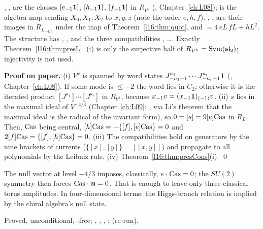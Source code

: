 \begin{dictionary}
, ,  are the classes $[e_{-1}\mathbf{1}]$, $[h_{-1}\mathbf{1}]$, $[f_{-1}\mathbf{1}]$ in
$R_{V^k}$ (, Chapter~\ref{ch:L08}); \allowbreak{} is the algebra map
sending $X_0,X_1,X_2$ to $x,y,z$ (note the order $e,h,f$). , ,  are their images in
$R_{L_{-4/3}}$ under the map of Theorem~\ref{l16:thm:quot}, and  $=4\,eL\,fL + hL^2$. The structure
 has \allowbreak{}, \allowbreak{},
\allowbreak{}\allowbreak{} and the three compatibilities , \ldots. Exactly
Theorem~\ref{l16:thm:presL}. (i) is only the surjective half of $R_{V^k} = \operatorname{Sym}(\mathfrak{sl}_2)$; injectivity is not
used.
\end{dictionary}

\textbf{Proof on paper.} (i) $V^k$ is spanned by word states $J^{a_1}_{-n_1-1}\cdots J^{a_r}_{-n_r-1}\mathbf{1}$
(, Chapter~\ref{ch:L08}). If some mode is $\le-2$ the word lies in $C_2$; otherwise it is the iterated
product $[J^{a_1}]\cdots[J^{a_r}]$ in $R_{V^k}$, because $x_{-1}v = (x_{-1}\mathbf{1})_{(-1)}v$. (ii) $s$ lies in the maximal ideal
of $V^{-4/3}$ (Chapter~\ref{ch:L09}: \allowbreak{}\allowbreak{}, via Li's theorem that the maximal ideal is the radical of
the invariant form), so $0 = [s] = 9[e]\mathrm{Cas}$ in $R_{L}$. Then, $\mathrm{Cas}$ being central,
$[h]\mathrm{Cas} = -\{[f],[e]\mathrm{Cas}\} = 0$ and $2[f]\mathrm{Cas} = \{[f],[h]\mathrm{Cas}\} = 0$. (iii) The
compatibilities hold on generators by the nine brackets of currents ($\{[x],[y]\} = [[x,y]]$) and propagate to all
polynomials by the Leibniz rule. (iv) Theorem~\ref{l16:thm:presCons}(i). \qed

\begin{physics}
The null vector at level $-4/3$ imposes, classically, $e\cdot\mathrm{Cas} = 0$; the $SU(2)$ symmetry then forces
$\mathrm{Cas}\cdot\mathfrak m = 0$. That is enough to leave only three classical torus amplitudes. In four-dimensional terms:
the Higgs-branch relation is implied by the chiral algebra's null state.
\end{physics}

\begin{status}
Proved, unconditional, -free; \allowbreak{}\allowbreak{}, \allowbreak{}\allowbreak{},
\allowbreak{}, \allowbreak{}\allowbreak{}: \lean{[propext,
Classical.}\allowbreak{}\allowbreak\lean{sound]} (re-run).
\end{status}

